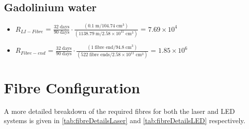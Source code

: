 \documentclass[a4paper,11pt]{article}
\begin{document}
\subsection{Gadolinium water}\label{RCalcGd}
\begin{itemize}
    \item $R_{LI-Fibre}$ = $\frac{32\;\text{days}}{90\;\text{days}}\cdot \frac{\left(0.1\;\text{m}/104.74\;\text{cm}^3\right)}{\left(1138.79\;\text{m}/2.58\times10^{11}\;\text{cm}^3\right)}$ = $7.69 \times 10^4$
    \item $R_{Fibre-end}$ = $\frac{32\;\text{days}}{90\;\text{days}}\cdot \frac{\left(1\;\text{fibre end}/94.8\;\text{cm}^3\right)}{\left(522\;\text{fibre ends}/2.58\times10^{11}\;\text{cm}^3\right)}$ = $1.85 \times 10^6$
\end{itemize}

\clearpage
\newpage

\section{Fibre Configuration}\label{app:fibreconfig}

A more detailed breakdown of the required fibres for both the laser and LED systems is given in \cref{tab:fibreDetailsLaser} and \cref{tab:fibreDetailsLED} respectively.
\end{document}
